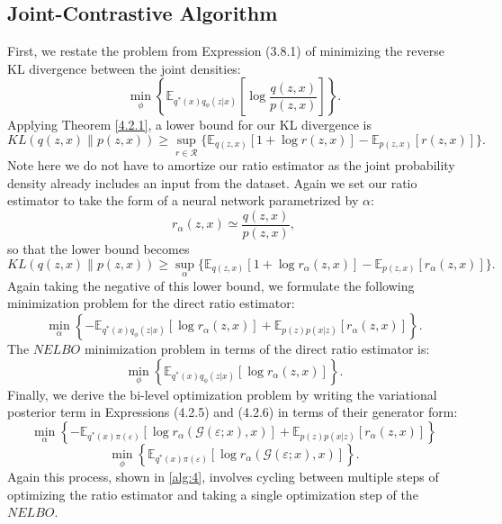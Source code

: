 \documentclass[honours,12pt, twoside]{unswthesis}
\newcommand{\E}{\mathbb{E}}
\numberwithin{equation}{section}
\theoremstyle{definition}
\begin{document}
\subsection{Joint-Contrastive Algorithm}\label{sec:4.2.3}
First, we restate the problem from Expression (3.8.1) of minimizing the reverse KL divergence between the joint densities:
\[\min_\phi \left\lbrace\mathbb{E}_{q^*(x)q_\phi(z|x)}\left[\log \frac{q(z,x)}{p(z,x)}\right]\right\rbrace.\]
Applying Theorem \ref{4.2.1}, a lower bound for our KL divergence is
\[KL(q(z,x)\|p(z,x))\geq \sup_{r\in \mathcal{R}}\{\mathbb{E}_{q(z,x)}[1+\log r(z,x)]-\mathbb{E}_{p(z,x)}[r(z,x)]\}.\]
Note here we do not have to amortize our ratio estimator as the joint probability density already includes an input from the dataset. Again we set our ratio estimator to take the form of a neural network parametrized by $\alpha$:
\[r_\alpha(z,x)\simeq \frac{q(z,x)}{p(z,x)},\]
so that the lower bound becomes
\[KL(q(z,x)\|p(z,x))\geq \sup_{\alpha}\{\mathbb{E}_{q(z,x)}[1+\log r_\alpha(z,x)]-\mathbb{E}_{p(z,x)}[r_\alpha(z,x)]\}.\]
Again taking the negative of this lower bound, we formulate the following minimization problem for the direct ratio estimator:
\begin{equation}
\min_\alpha\left\lbrace-\E_{q^*(x)q_\phi(z|x)}[\log r_\alpha(z,x)]+\E_{p(z)p(x|z)}[r_\alpha(z,x)]\right\rbrace.
\end{equation}
The $NELBO$ minimization problem in terms of the direct ratio estimator is:
\begin{equation}
\min_\phi \left\lbrace\mathbb{E}_{q^*(x)q_\phi(z|x)}[\log r_\alpha(z,x)]\right\rbrace.
\end{equation}
Finally, we derive the bi-level optimization problem by writing the variational posterior term in Expressions (4.2.5) and (4.2.6) in terms of their generator form:
\[\min_\alpha \left\lbrace-\mathbb{E}_{q^*(x)\pi(\varepsilon)}[\log r_\alpha(\mathcal{G}(\varepsilon;x),x)]+\mathbb{E}_{p(z)p(x|z)}[r_\alpha(z,x)]\right\rbrace\]
\[\min_\phi \left\lbrace\mathbb{E}_{q^*(x)\pi(\varepsilon)}[\log r_\alpha(\mathcal{G}(\varepsilon;x),x)]\right\rbrace.\]
Again this process, shown in \autoref{alg:4}, involves cycling between multiple steps of optimizing the ratio estimator and taking a single optimization step of the $NELBO$.
\end{document}
